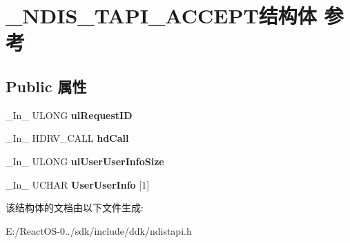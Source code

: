 \hypertarget{struct___n_d_i_s___t_a_p_i___a_c_c_e_p_t}{}\section{\+\_\+\+N\+D\+I\+S\+\_\+\+T\+A\+P\+I\+\_\+\+A\+C\+C\+E\+P\+T结构体 参考}
\label{struct___n_d_i_s___t_a_p_i___a_c_c_e_p_t}
\subsection*{Public 属性}
\begin{DoxyCompactItemize}
\item 
\mbox{\label{struct___n_d_i_s___t_a_p_i___a_c_c_e_p_t_a48a2a9e9afd9bf733d75c2aac2f1ef92}} 
\+\_\+\+In\+\_\+ U\+L\+O\+NG {\bfseries ul\+Request\+ID}
\item 
\mbox{\label{struct___n_d_i_s___t_a_p_i___a_c_c_e_p_t_ab87978df5f10beb985e359aeecb32fb6}} 
\+\_\+\+In\+\_\+ H\+D\+R\+V\+\_\+\+C\+A\+LL {\bfseries hd\+Call}
\item 
\mbox{\label{struct___n_d_i_s___t_a_p_i___a_c_c_e_p_t_aa2e513a07100c0768fa917519a3242ec}} 
\+\_\+\+In\+\_\+ U\+L\+O\+NG {\bfseries ul\+User\+User\+Info\+Size}
\item 
\mbox{\label{struct___n_d_i_s___t_a_p_i___a_c_c_e_p_t_a3ef599087ffecbe45db67c9f51b33d20}} 
\+\_\+\+In\+\_\+ U\+C\+H\+AR {\bfseries User\+User\+Info} \mbox{[}1\mbox{]}
\end{DoxyCompactItemize}


该结构体的文档由以下文件生成\+:\begin{DoxyCompactItemize}
\item 
E\+:/\+React\+O\+S-\/0../sdk/include/ddk/ndistapi.\+h\end{DoxyCompactItemize}
